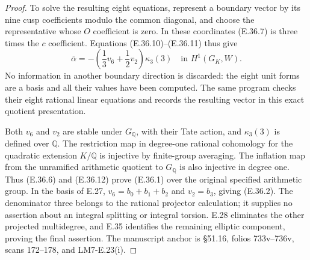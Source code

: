 \begin{proof}
To solve the resulting eight equations,
represent a boundary vector by its nine
cusp coefficients modulo the common
diagonal, and choose the representative
whose $O$ coefficient is zero. In these
coordinates (E.36.7) is three times the
$c$ coefficient. Equations
(E.36.10)--(E.36.11) thus give
\[
 \overline\alpha=
      -\left(\frac13v_6+\frac12v_2\right)\kappa_3(3)
             \quad\text{in }H^1(G_K,W).
 \tag{E.36.12}
\]
No information in another boundary direction
is discarded: the eight unit forms are a
basis and all their values have been computed.
The same program checks their eight rational
linear equations and records the resulting
vector in this exact quotient presentation.

Both $v_6$ and $v_2$ are stable under
$G_{\mathbb Q}$, with their Tate action,
and $\kappa_3(3)$ is defined over
$\mathbb Q$. The restriction map in
degree-one rational cohomology for the
quadratic extension $K/\mathbb Q$ is
injective by finite-group averaging. The inflation
map from the unramified arithmetic quotient
to $G_{\mathbb Q}$ is also injective in
degree one. Thus (E.36.6) and (E.36.12)
prove (E.36.1) over the original specified
arithmetic group. In the basis of E.27,
$v_6=b_0+b_1+b_2$ and $v_2=b_3$, giving
(E.36.2). The denominator three belongs
to the rational projector calculation;
it supplies no assertion about an
integral splitting or integral torsion.
E.28 eliminates the other projected
multidegree, and E.35 identifies the
remaining elliptic component, proving
the final assertion. The manuscript
anchor is \S51.16, folios 733v--736v,
scans 172--178, and LM7-E.23(i).
\end{proof}
